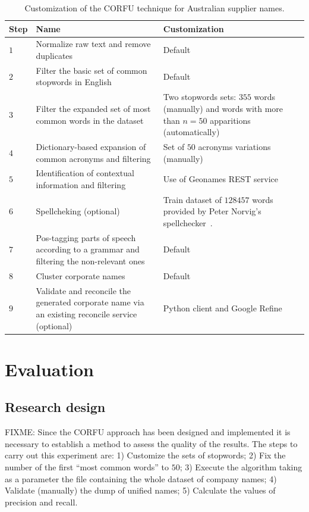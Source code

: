 \documentclass{llncs}
\begin{document}
\begin{table}[!htb]
\renewcommand{\arraystretch}{1.3}
\begin{center}
\begin{tabular}{|p{1cm}|p{6cm}|p{6cm}|}
\hline
  \textbf{Step} & \textbf{Name} & \textbf{Customization}  \\  \hline
  $1$ & Normalize raw text and remove duplicates & Default \\ \hline
  $2$ & Filter the basic set of common stopwords in English & Default\\ \hline
  $3$ & Filter the expanded set of most common words in the dataset & Two stopwords sets: $355$ words (manually) and words with more than $n=50 $ apparitions (automatically) \\ \hline
  $4$ & Dictionary-based expansion of common acronyms and filtering & Set of $50$ acronyms variations (manually) \\ \hline
  $5$ & Identification of contextual information and filtering & Use of Geonames REST service\\ \hline
  $6$ & Spellcheking (optional) & Train dataset of $128457$ words provided by Peter Norvig's spellchecker~\cite{NorvigSpelling}. \\ \hline
  $7$ & Pos-tagging parts of speech according to a grammar and filtering the non-relevant ones & Default \\ \hline
  $8$ & Cluster corporate names & Default \\ \hline
  $9$ & Validate and reconcile the generated corporate name via an existing reconcile service (optional) & Python client and Google Refine \\ \hline
  \hline
  \end{tabular}
  \caption{Customization of the CORFU technique for Australian supplier names.}
  \label{config-corfu}
  \end{center}
\end{table} 

\section{Evaluation}
\subsection{Research design}
FIXME: Since the CORFU approach has been designed and implemented it is necessary to 
establish a method to assess the quality of the results. The steps to carry 
out this experiment are: 1) Customize the sets of stopwords; 2) Fix the number 
of the first ``most common words'' to $50$; 3) Execute the algorithm taking 
as a parameter the file containing the whole dataset of company names; 4) 
Validate (manually) the dump of unified names; 5) Calculate the values of 
precision and recall.   
\end{document}
